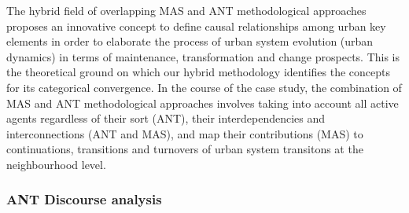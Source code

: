 \documentclass[11pt]{report}
\begin{document}
The hybrid field of overlapping MAS and ANT methodological approaches proposes an innovative concept to define causal relationships among urban key elements in order to elaborate the process of urban system evolution (urban dynamics) in terms of maintenance, transformation and change prospects.
This is the theoretical ground on which our hybrid methodology identifies the concepts for its categorical convergence. In the course of the case study, the combination of MAS and ANT methodological approaches involves taking into account all active agents regardless of their sort (ANT), their interdependencies and interconnections (ANT and MAS), and map their contributions (MAS) to continuations, transitions and turnovers of urban system transitons at the neighbourhood level.    

\subsubsection{ANT Discourse analysis}
\end{document}
